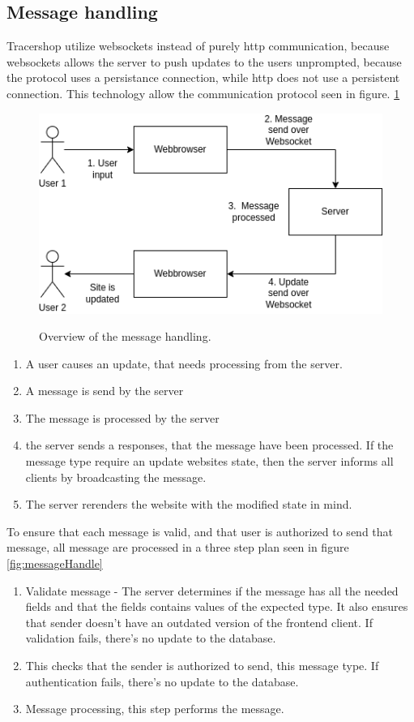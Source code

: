 \documentclass{article}
\begin{document}
\subsection*{Message handling}
Tracershop utilize websockets instead of purely http communication,
because websockets allows the server to push updates to the users unprompted,
because the protocol uses a persistance connection, while http does not use a
persistent connection. This technology allow the communication protocol seen in
figure. \ref*{fig:websocketMessage}

\begin{figure}[ht]
  \begin{center}
    \includegraphics[width=0.6\linewidth]{websocketMessage.png}
    \label{fig:websocketMessage}
    \caption{Overview of the message handling.}
  \end{center}
\end{figure}

\begin{enumerate}
  \item A user causes an update, that needs processing from the server.
  \item A message is send by the server
  \item The message is processed by the server
  \item the server sends a responses, that the message have been processed. If
  the message type require an update websites state, then the server informs
  all clients by broadcasting the message.
  \item The server rerenders the website with the modified state in mind.
\end{enumerate}

To ensure that each message is valid, and that user is authorized to send that
message, all message are processed in a three step plan seen in figure
\ref*{fig:messageHandle}

\begin{enumerate}
  \item Validate message - The server determines if the message has all the
  needed fields and that the fields contains values of the expected type. It
  also ensures that sender doesn't have an outdated version of the frontend
  client. If validation fails, there's no update to the database.
  \item This checks that the sender is authorized to send, this message type.
  If authentication fails, there's no update to the database.
  \item Message processing, this step performs the message.
\end{enumerate}
\end{document}
